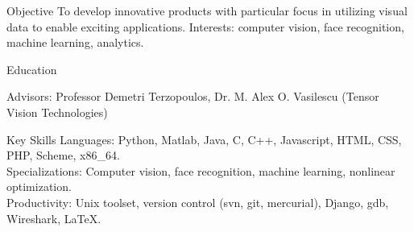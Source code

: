\documentclass{resume}
\begin{document}
\maketitle
\thispagestyle{empty} %

\vspace{-0.5em}

\begin{component}{Objective}
To develop innovative products with particular focus in utilizing visual data to enable exciting applications.
Interests: computer vision, face recognition, machine learning, analytics.\\
\end{component}

\vspace{-0.5em}

\begin{component}{Education}

    \hspace{2em} Advisors: Professor Demetri Terzopoulos, Dr. M. Alex O. Vasilescu (Tensor Vision Technologies)
    
\end{component}

\vspace{0.5em}

\begin{component}{Key Skills}
		Languages: Python, Matlab, Java, C, C++, Javascript, HTML, CSS, PHP, Scheme, x86\_64.\\
        Specializations: Computer vision, face recognition, machine learning, nonlinear optimization.\\
		Productivity: Unix toolset, version control (svn, git, mercurial), Django, gdb, Wireshark, LaTeX.
\end{component}

\vspace{0.5em}
\end{document}
